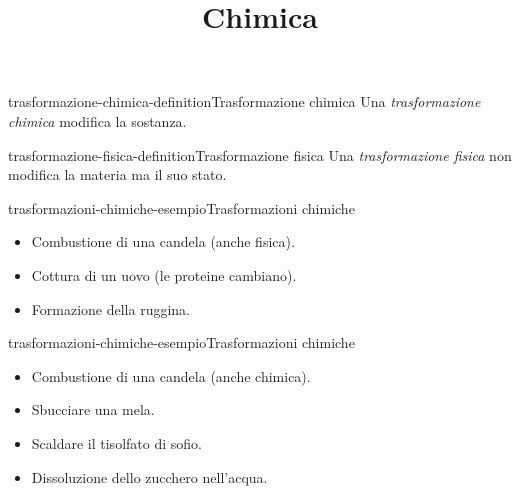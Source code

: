 \documentclass[preview]{standalone}
\begin{document}
\title{Chimica}
\genpage


\begin{snippetdefinition}{trasformazione-chimica-definition}{Trasformazione chimica}
    Una \textit{trasformazione chimica}
    modifica la sostanza.
\end{snippetdefinition}


\begin{snippetdefinition}{trasformazione-fisica-definition}{Trasformazione fisica}
    Una \textit{trasformazione fisica}
    non modifica la materia ma il suo stato.
\end{snippetdefinition}


\begin{snippetexample}{trasformazioni-chimiche-esempio}{Trasformazioni chimiche}
    \begin{itemize}
        \item Combustione di una candela (anche fisica).
        \item Cottura di un uovo (le proteine cambiano).
        \item Formazione della ruggina.
    \end{itemize}
\end{snippetexample}

\begin{snippetexample}{trasformazioni-chimiche-esempio}{Trasformazioni chimiche}
    \begin{itemize}
        \item Combustione di una candela (anche chimica).
        \item Sbucciare una mela.
        \item Scaldare il tisolfato di sofio.
        \item Dissoluzione dello zucchero nell'acqua.
    \end{itemize}
\end{snippetexample}
\end{document}
